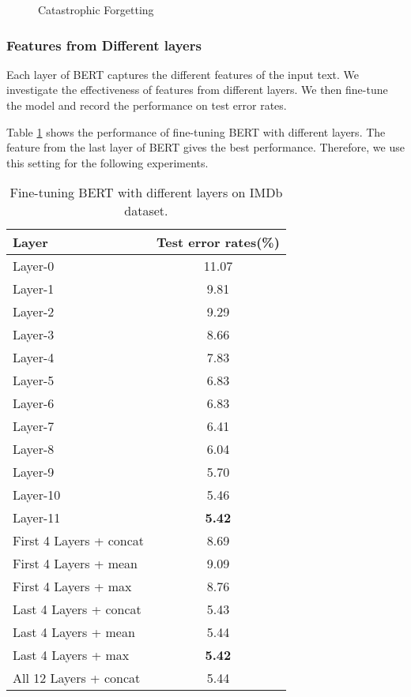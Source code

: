 \documentclass[11pt,a4paper]{article}
\theoremstyle{definition}
\begin{document}
\begin{CJK*}{UTF8}{gbsn}
\begin{figure*}[h!]
\centering
{}
	\caption{Catastrophic Forgetting}\label{fig:cat-forget}
\end{figure*}

\subsubsection{Features from Different layers}
Each layer of BERT captures the different features of the input text. We investigate the effectiveness of features from different layers. We then fine-tune the model and record the performance on test error rates.

Table \ref{tb:layers} shows the performance of fine-tuning BERT with different layers. The feature from the last layer of BERT gives the best performance. Therefore, we use this setting for the following experiments.





\begin{table}[h!]\small
\centering
\begin{tabular}{l c}
	\toprule
	Layer & Test error rates(\%) \\
	\midrule
	Layer-0 & 11.07 \\
	Layer-1 & 9.81 \\
	Layer-2 & 9.29 \\
	Layer-3 & 8.66 \\
	Layer-4 & 7.83 \\
	Layer-5 & 6.83 \\
	Layer-6 & 6.83 \\
	Layer-7 & 6.41 \\
	Layer-8 & 6.04 \\
	Layer-9 & 5.70 \\
	Layer-10 & 5.46 \\
	Layer-11 & \textbf{5.42} \\
	\midrule
	First 4 Layers + concat & 8.69 \\
	First 4 Layers + mean & 9.09 \\
	First 4 Layers + max & 8.76 \\
	\midrule
	Last 4 Layers + concat & 5.43 \\
	Last 4 Layers + mean & 5.44 \\
	Last 4 Layers + max & \textbf{5.42} \\
	\midrule
	All 12 Layers + concat & 5.44 \\
	\bottomrule
\end{tabular}
\caption{Fine-tuning BERT with different layers on IMDb dataset.
}\label{tb:layers}
\end{table}





\end{CJK*}
\end{document}
